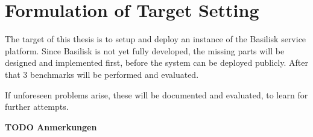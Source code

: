 \chapter{Formulation of Target Setting}
\label{ch:target_setting}

The target of this thesis is to setup and deploy an instance of the Basilisk service platform.
Since Basilisk is not yet fully developed, the missing parts will be designed and implemented first, before the system can be deployed publicly.
After that 3 benchmarks will be performed and evaluated.

If unforeseen problems arise, these will be documented and evaluated, to learn for further attempts.

\textbf{TODO Anmerkungen}




%
%
%
